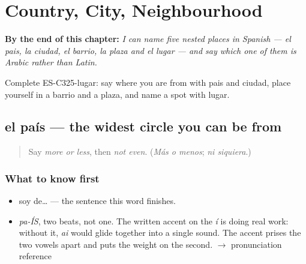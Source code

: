 
\chapter{Country, City, Neighbourhood}
\label{ch:pais-y-lugar}

\begin{chapteropening}
\textbf{By the end of this chapter:} \emph{I can name five nested places in Spanish — el pais, la ciudad, el barrio, la plaza and el lugar — and say which one of them is Arabic rather than Latin.}

Complete ES-C325-lugar: say where you are from with pais and ciudad, place yourself in a barrio and a plaza, and name a spot with lugar.
\end{chapteropening}

\section[el país]{el país — the widest circle you can be from}

\label{lesson:ES-C325-pais}



\begin{quote}
Say \emph{more or less}, then \emph{not even}. (\emph{Más o menos}; \emph{ni siquiera}.)
\end{quote}

\subsection*{What to know first}
\begin{itemize}
\raggedright
  \item soy de… — the sentence this word finishes.
\end{itemize}

\begin{sounds}
\begin{itemize}
\raggedright
  \item \emph{pa-ÍS}, two beats, not one. The written accent on the \emph{í} is doing real work: without it, \emph{ai} would glide together into a single sound. The accent prises the two vowels apart and puts the weight on the second. $\to$ pronunciation reference
\end{itemize}
\end{sounds}

